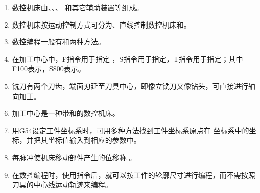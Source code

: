 \documentclass[12pt,twocolumn,landscape,UTF8,twoside]{ctexart}
\author{李建闽}
\begin{document}
\noindent%
\pagenumstyle%
\begin{spacing}{1.5}%
\begin{center}
\end{center}
\examothertable
\end{spacing}
\vspace{-10pt}
\songti%
\begin{spacing}{1}
\begin{enumerate} [1.]
\item 数控机床由、、、 和其它辅助装置等组成。%

\item 数控机床按运动控制方式可分为、直线控制数控机床和。%

\item 数控编程一般有和两种方法。

\item 在加工中心中，F指令用于指定 ，S指令用于指定，T指令用于指定；其中F100表示，S800表示。

\item {}铣刀有两个刀齿，端面刃延至刀具中心，即像立铣刀又像钻头，可直接进行轴向加工。

\item 加工中心是一种带和的数控机床。

\item 用G54设定工件坐标系时，可用多种方法找到工件坐标系原点在 坐标系中的坐标，并把其坐标值输入到相应的参数中。

\item 每脉冲使机床移动部件产生的位移称  		。

\item 在数控编程时，使用指令后，就可以按工件的轮廓尺寸进行编程，而不需按照刀具的中心线运动轨迹来编程。


\end{enumerate}
\end{spacing}
\end{document}
